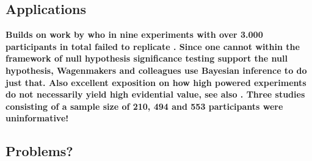 \documentclass[12pt]{scrartcl}
\begin{document}
\subsection{Applications}
\begin{description}
  \item {}
  
  \item {}
 
  \item {}
  
  \item {}

  \item {}
  
  \textbf{Builds on work by \cite{donnellan2014association} who in nine experiments with over 3.000 participants in total failed to replicate \cite{bargh2012substitutability}. Since one cannot within the framework of null hypothesis significance testing support the null hypothesis, Wagenmakers and colleagues use Bayesian inference to do just that. Also excellent exposition on how high powered experiments do not necessarily yield high evidential value, see also \cite{wagenmakers2014power}. Three studies consisting of a sample size of 210, 494 and 553 participants were uninformative!}

  \item {}

  \item {}
\end{description}


\subsection{Problems?}
\begin{description}
  \item {}
  
  \item {}
\end{description}
\end{document}
